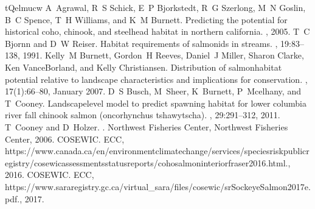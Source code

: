 \documentclass[letterpaper,10pt,english]{jupyterBook}
\begin{document}
\begin{sphinxthebibliography}{tQelmucw}
\sphinxAtStartPar
A Agrawal, R S Schick, E P Bjorkstedt, R G Szerlong, M N Goslin, B C Spence, T H Williams, and K M Burnett. Predicting the potential for historical coho, chinook, and steelhead habitat in northern california. , 2005.
\sphinxAtStartPar
T C Bjornn and D W Reiser. Habitat requirements of salmonids in streams. , 19:83–138, 1991.
\sphinxAtStartPar
Kelly M Burnett, Gordon H Reeves, Daniel J Miller, Sharon Clarke, Ken Vance\sphinxhyphen{}Borland, and Kelly Christiansen. Distribution of salmon\sphinxhyphen{}habitat potential relative to landscape characteristics and implications for conservation. , 17(1):66–80, January 2007.
\sphinxAtStartPar
D S Busch, M Sheer, K Burnett, P Mcelhany, and T Cooney. Landscape\sphinxhyphen{}level model to predict spawning habitat for lower columbia river fall chinook salmon (oncorhynchus tshawytscha). , 29:291–312, 2011.
\sphinxAtStartPar
T Cooney and D Holzer. . Northwest Fisheries Center, Northwest Fisheries Center, 2006.
\sphinxAtStartPar
COSEWIC.  ECC, https://www.canada.ca/en/environment\sphinxhyphen{}climate\sphinxhyphen{}change/services/species\sphinxhyphen{}risk\sphinxhyphen{}public\sphinxhyphen{}registry/cosewic\sphinxhyphen{}assessments\sphinxhyphen{}status\sphinxhyphen{}reports/coho\sphinxhyphen{}salmon\sphinxhyphen{}interior\sphinxhyphen{}fraser\sphinxhyphen{}2016.html., 2016.
\sphinxAtStartPar
COSEWIC.  ECC, https://www.sararegistry.gc.ca/virtual\_sara/files/cosewic/srSockeyeSalmon2017e.pdf., 2017.

\end{sphinxthebibliography}
\end{document}

